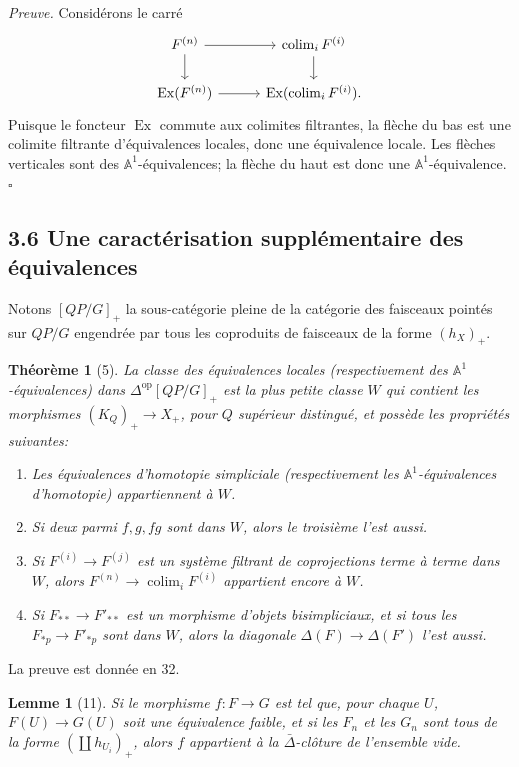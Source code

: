 \documentclass[11pt]{article}
\newcommand{\Aone}{\mathbb A^1}
\theoremstyle{deligne}
\newtheorem*{theorem*}{Théorème}
\newtheorem*{lemma*}{Lemme}
\newenvironment{proofdel}{\noindent\textit{Preuve.}}{\hfill$\square$}
\newcommand{\colim}{\operatorname{colim}}
\newcommand{\op}{\mathrm{op}}
\newcommand{\Ex}{\operatorname{Ex}}
\begin{document}
\begin{proofdel}
Considérons le carré
\[
\begin{tikzcd}[column sep=3.0em,row sep=1.7em]
F^{(n)} \arrow[r] \arrow[d] & \colim_iF^{(i)} \arrow[d] \\
\Ex(F^{(n)}) \arrow[r] & \Ex(\colim_iF^{(i)}) .
\end{tikzcd}
\]
Puisque le foncteur \(\Ex\) commute aux colimites filtrantes, la flèche du bas est une colimite filtrante d'équivalences locales, donc une équivalence locale. Les flèches verticales sont des \(\Aone\)-équivalences; la flèche du haut est donc une \(\Aone\)-équivalence.
\end{proofdel}

\subsection*{3.6 Une caractérisation supplémentaire des équivalences}

Notons \([QP/G]_+\) la sous-catégorie pleine de la catégorie des faisceaux pointés sur \(QP/G\) engendrée par tous les coproduits de faisceaux de la forme \((h_X)_+\).

\begin{theorem*}[5]
La classe des équivalences locales (respectivement des \(\Aone\)-équivalences) dans \(\Delta^{\op}[QP/G]_+\) est la plus petite classe \(W\) qui contient les morphismes \((K_Q)_+\to X_+\), pour \(Q\) supérieur distingué, et possède les propriétés suivantes:
\begin{enumerate}[label=\arabic*.]
\item Les équivalences d'homotopie simpliciale (respectivement les \(\Aone\)-équivalences d'homotopie) appartiennent à \(W\).
\item Si deux parmi \(f,g,fg\) sont dans \(W\), alors le troisième l'est aussi.
\item Si \(F^{(i)}\to F^{(j)}\) est un système filtrant de coprojections terme à terme dans \(W\), alors \(F^{(n)}\to\colim_iF^{(i)}\) appartient encore à \(W\).
\item Si \(F_{**}\to F'_{**}\) est un morphisme d'objets bisimpliciaux, et si tous les \(F_{*p}\to F'_{*p}\) sont dans \(W\), alors la diagonale \(\Delta(F)\to\Delta(F')\) l'est aussi.
\end{enumerate}
\end{theorem*}

La preuve est donnée en 32.

\begin{lemma*}[11]
Si le morphisme \(f:F\to G\) est tel que, pour chaque \(U\), \(F(U)\to G(U)\) soit une équivalence faible, et si les \(F_n\) et les \(G_n\) sont tous de la forme \((\coprod h_{U_i})_+\), alors \(f\) appartient à la \(\bar\Delta\)-clôture de l'ensemble vide.
\end{lemma*}
\end{document}
